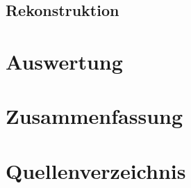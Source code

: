 \documentclass[ngerman,a4paper]{scrartcl}
\begin{document}
\subsection{Rekonstruktion}


\section{Auswertung}


\section{Zusammenfassung}


\section{Quellenverzeichnis}

\end{document}
